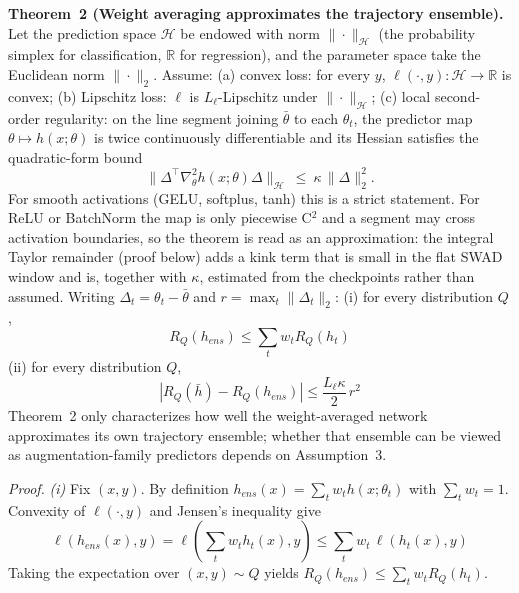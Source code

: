 \documentclass[electronics,article,submit,moreauthors]{Definitions/mdpi}
\newcommand{\add}[1]{\textcolor{addblue}{#1}}
\newcommand{\del}[1]{\textcolor{delred}{\st{#1}}}
\def\add#1{#1}%
\def\del#1{}%
\renewcommand{\add}[1]{#1}
\renewcommand{\del}[1]{}
\begin{document}
\noindent\textbf{Theorem~2 (Weight averaging approximates the trajectory ensemble).} Let the prediction space $\mathcal{H}$ be endowed with norm $\|\cdot\|_{\mathcal{H}}$ (the probability simplex for classification, $\mathbb{R}$ for regression), and the parameter space take the Euclidean norm $\|\cdot\|_2$. Assume:
(a) convex loss: for every $y$, $\ell(\cdot,y):\mathcal{H}\to\mathbb{R}$ is convex;
(b) Lipschitz loss: $\ell$ is $L_{\ell}$-Lipschitz under $\|\cdot\|_{\mathcal{H}}$;
(c) local second-order regularity: on the line segment joining $\bar\theta$ to each $\theta_t$, \del{the Hessian of the predictor map \mbox{$\theta\mapsto h(x;\theta)$} satisfies the quadratic-form bound}\add{the predictor map $\theta\mapsto h(x;\theta)$ is twice continuously differentiable and its Hessian satisfies the quadratic-form bound}
\begin{equation}
\|\Delta^{\top}\nabla_{\theta}^{2}h(x;\theta)\Delta\|_{\mathcal{H}}\ \leq\ \kappa\,\|\Delta\|_{2}^{2}.
\end{equation}
\del{For networks containing ReLU or BatchNorm, this holds except at non-differentiable points (which have measure zero), with \mbox{$\kappa$} the essential supremum.}\add{For smooth activations (GELU, softplus, tanh) this is a strict statement. For ReLU or BatchNorm the map is only piecewise C$^2$ and a segment may cross activation boundaries, so the theorem is read as an approximation: the integral Taylor remainder (proof below) adds a kink term that is small in the flat SWAD window and is, together with $\kappa$, estimated from the checkpoints rather than assumed.}
Writing $\Delta_t=\theta_t-\bar\theta$ and $r=\max_t\|\Delta_t\|_2$:
(i) for every distribution $Q$,
\begin{equation}
R_Q(h_{ens})\leq\sum_t w_t R_Q(h_t)
\end{equation}
(ii) for every distribution $Q$,
\begin{equation}
\left|R_Q(\bar h)-R_Q(h_{ens})\right|\leq\frac{L_{\ell}\kappa}{2}\,r^{2}
\end{equation}
Theorem~2 only characterizes how well the weight-averaged network approximates its own trajectory ensemble; whether that ensemble can be viewed as augmentation-family predictors depends on Assumption~3.

\noindent\textit{Proof.}
\emph{(i)} Fix $(x,y)$. By definition $h_{ens}(x)=\sum_t w_t h(x;\theta_t)$ with $\sum_t w_t=1$. Convexity of $\ell(\cdot,y)$ and Jensen's inequality give
\begin{equation}
\ell(h_{ens}(x),y)=\ell\!\left(\sum_t w_t h_t(x),y\right)\leq\sum_t w_t\,\ell(h_t(x),y)
\end{equation}
Taking the expectation over $(x,y)\sim Q$ yields $R_Q(h_{ens})\leq\sum_t w_t R_Q(h_t)$.
\end{document}
